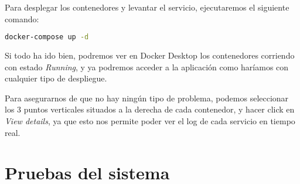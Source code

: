 
Para desplegar los contenedores y levantar el servicio, ejecutaremos el siguiente comando:

\begin{lstlisting}[language=Bash]
docker-compose up -d
\end{lstlisting}


Si todo ha ido bien, podremos ver en Docker Desktop los contenedores corriendo con estado \textit{Running}, y ya podremos acceder a la aplicación como haríamos con cualquier tipo de despliegue. 


Para asegurarnos de que no hay ningún tipo de problema, podemos seleccionar los 3 puntos verticales situados a la derecha de cada contenedor, y hacer click en \textit{View details}, ya que esto nos permite poder ver el log de cada servicio en tiempo real. 

\section{Pruebas del sistema}
